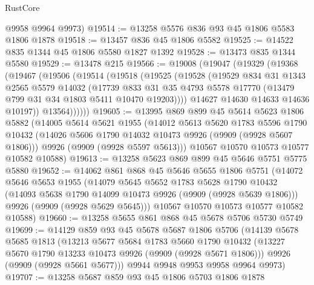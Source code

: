 \begin{lexlean}{RustCore}
\begin{coremodule}
      @9958
      @9964
      @9973)
@19514 := @13258 @5576 @836 @93 @45 @1806 @5583 @1806 @1878
@19518 := @13457 @836 @45 @1806 @5582
@19525 := @14522 @835 @1344 @45 @1806 @5580 @1827 @1392
@19528 := @13473 @835 @1344 @5580
@19529 := @13478 @215
@19566 := @19008
    (@19047
      (@19329
        (@19368
          (@19467
            (@19506
              (@19514
                (@19518
                  (@19525
                    (@19528
                      (@19529
                        @834
                        @31
                        @1343
                        @2565
                        @5579
                        @14032
                        (@17739
                          @833
                          @31
                          @35
                          @4793
                          @5578
                          @17770
                          (@13479 @799 @31 @34 @1803 @5411 @10470 @19203))))
                    @14627
                    @14630
                    @14633
                    @14636
                    @10197))
                @13564))))))
@19605 := @13995
    @869
    @899
    @45
    @5614
    @5623
    @1806
    @5882
    (@14005
      @5614
      @5621
      @1955
      (@14012
        @5613
        @5620
        @1783
        @5596
        @1790
        @10432
        (@14026 @5606 @1790 @14032 @10473 @9926 (@9909 (@9928 @5607 @1806)))
        @9926
        (@9909 (@9928 @5597 @5613)))
      @10567
      @10570
      @10573
      @10577
      @10582
      @10588)
@19613 := @13258 @5623 @869 @899 @45 @5646 @5751 @5775 @5880
@19652 := @14062
    @861
    @868
    @45
    @5646
    @5655
    @1806
    @5751
    (@14072
      @5646
      @5653
      @1955
      (@14079
        @5645
        @5652
        @1783
        @5628
        @1790
        @10432
        (@14093 @5638 @1790 @14099 @10473 @9926 (@9909 (@9928 @5639 @1806)))
        @9926
        (@9909 (@9928 @5629 @5645)))
      @10567
      @10570
      @10573
      @10577
      @10582
      @10588)
@19660 := @13258 @5655 @861 @868 @45 @5678 @5706 @5730 @5749
@19699 := @14129
    @859
    @93
    @45
    @5678
    @5687
    @1806
    @5706
    (@14139
      @5678
      @5685
      @1813
      (@13213
        @5677
        @5684
        @1783
        @5660
        @1790
        @10432
        (@13227 @5670 @1790 @13233 @10473 @9926 (@9909 (@9928 @5671 @1806)))
        @9926
        (@9909 (@9928 @5661 @5677)))
      @9944
      @9948
      @9953
      @9958
      @9964
      @9973)
@19707 := @13258 @5687 @859 @93 @45 @1806 @5703 @1806 @1878

\end{coremodule}
\end{lexlean}
